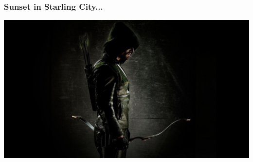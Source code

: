 \begin{frame}
\frametitle{Sunset in Starling City...}

\begin{center}
	\includegraphics[width=\textwidth]{images/arrow.jpg}
\end{center}

\end{frame}




